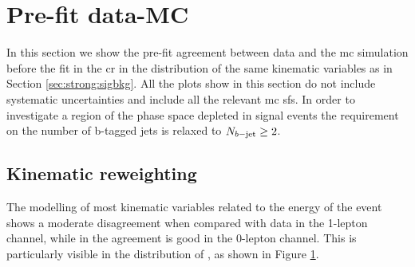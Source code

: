 
\section{Pre-fit data-MC}
\label{sec:strong:dataMC}
In this section we show the pre-fit agreement between data and the \gls{mc} simulation before the fit in the \gls{cr}
in the distribution of the same kinematic variables as in Section \ref{sec:strong:sigbkg}. 
All the plots show in this section do not include systematic uncertainties and include all the relevant \gls{mc} \glspl{sf}. 
In order to investigate a region of the phase space depleted in signal events the requirement on the number
of b-tagged jets is relaxed to $N_{b\mathrm{-jet}} \geq 2$. 

\subsection*{Kinematic reweighting}

The modelling of most kinematic variables related to the energy of the event shows a moderate disagreement 
when compared with data in the 1-lepton channel, while in the agreement is good in the 0-lepton channel. 
This is particularly visible in the distribution of \meff, as shown in Figure \ref{fig:strong:datamc:meff_prerw}.

\begin{figure}[h]
\centering 
{}
\caption{ 
}
\label{fig:strong:datamc:meff_prerw}
\end{figure}

